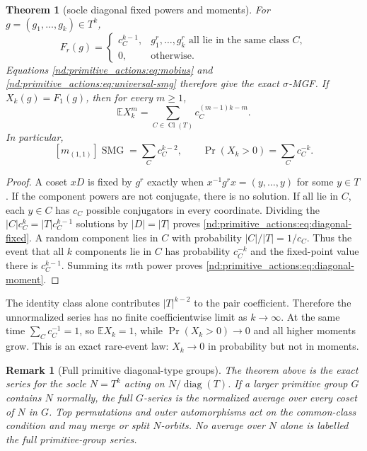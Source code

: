 \documentclass[10pt]{article}
\newcommand{\SMG}{\operatorname{SMG}}
\newcommand{\MGF}{\SMG}
\newcommand{\E}{\mathbb E}
\newcommand{\Cl}{\operatorname{Cl}}
\newtheorem{theorem}{Theorem}
\newtheorem{remark}{Remark}
\begin{document}
\begin{theorem}[socle diagonal fixed powers and moments]\label{nd:primitive_actions:thm:diagonal}
For $g=(g_1,\ldots,g_k)\in T^k$,
\begin{equation}\label{nd:primitive_actions:eq:diagonal-fixed}
 \boxed{F_r(g)=
 \begin{cases}
 c_C^{k-1},&g_1^r,\ldots,g_k^r\text{ all lie in the same class }C,\\
 0,&\text{otherwise}.
 \end{cases}}
\end{equation}
Equations \eqref{nd:primitive_actions:eq:mobius} and \eqref{nd:primitive_actions:eq:universal-smg} therefore give the
exact $\sigma$-MGF.  If $X_k(g)=F_1(g)$, then for every $m\ge1$,
\begin{equation}\label{nd:primitive_actions:eq:diagonal-moment}
 \boxed{\E X_k^m=\sum_{C\in\Cl(T)}c_C^{(m-1)k-m}.}
\end{equation}
In particular,
\begin{equation}\label{nd:primitive_actions:eq:diagonal-pair}
 [m_{(1,1)}]\MGF=\sum_Cc_C^{k-2},
 \qquad
 \Pr(X_k>0)=\sum_Cc_C^{-k}.
\end{equation}
\end{theorem}

\begin{proof}
A coset $xD$ is fixed by $g^r$ exactly when
$x^{-1}g^rx=(y,\ldots,y)$ for some $y\in T$.  If the component powers are
not conjugate, there is no solution.  If all lie in $C$, each $y\in C$ has
$c_C$ possible conjugators in every coordinate.  Dividing the
$|C|c_C^k=|T|c_C^{k-1}$ solutions by $|D|=|T|$ proves
\eqref{nd:primitive_actions:eq:diagonal-fixed}.  A random component lies in $C$ with probability
$|C|/|T|=1/c_C$.  Thus the event that all $k$ components lie in $C$ has
probability $c_C^{-k}$ and the fixed-point value there is $c_C^{k-1}$.
Summing its $m$th power proves \eqref{nd:primitive_actions:eq:diagonal-moment}.
\end{proof}

The identity class alone contributes $|T|^{k-2}$ to the pair coefficient.
Therefore the unnormalized series has no finite coefficientwise limit as
$k\to\infty$.  At the same time $\sum_Cc_C^{-1}=1$, so $\E X_k=1$, while
$\Pr(X_k>0)\to0$ and all higher moments grow.  This is an exact rare-event
law: $X_k\to0$ in probability but not in moments.

\begin{remark}[Full primitive diagonal-type groups]
The theorem above is the exact series for the socle $N=T^k$ acting on
$N/\operatorname{diag}(T)$. If a larger primitive group $G$ contains $N$
normally, the full $G$-series is the normalized average over every coset of
$N$ in $G$. Top permutations and outer automorphisms act on the common-class
condition and may merge or split $N$-orbits. No average over $N$ alone is
labelled the full primitive-group series.
\end{remark}
\end{document}
